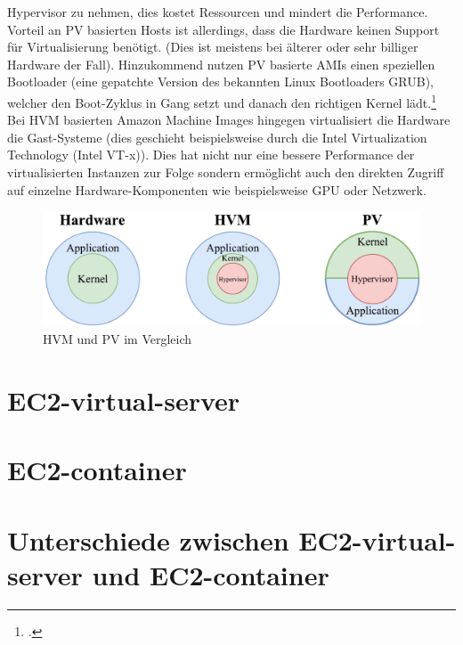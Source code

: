 \documentclass[titlepage]{report}
\begin{document}
Hypervisor zu nehmen, dies kostet Ressourcen und mindert die
Performance. Vorteil an PV basierten Hosts ist allerdings, dass die
Hardware keinen Support für Virtualisierung benötigt. (Dies ist meistens
bei älterer oder sehr billiger Hardware der Fall). Hinzukommend nutzen
PV basierte AMIs einen speziellen Bootloader (eine gepatchte Version des
bekannten Linux Bootloaders GRUB), welcher den Boot\hyp{}Zyklus in
Gang setzt und danach den richtigen Kernel
lädt.\footcite{virtualization} Bei HVM basierten Amazon Machine Images
hingegen virtualisiert die Hardware die Gast\hyp{}Systeme (dies geschieht
beispielsweise durch die Intel Virtualization Technology (Intel VT\hyp{}x)).
Dies hat nicht nur eine bessere Performance der virtualisierten
Instanzen zur Folge sondern ermöglicht auch den direkten Zugriff auf
einzelne Hardware\hyp{}Komponenten wie beispielsweise GPU oder Netzwerk.
\begin{figure}[h]
    \centering
    \includegraphics[width=1.0\textwidth]{figures/hvm_pv.pdf}
    \caption{HVM und PV im Vergleich}\label{fig:5}
\end{figure}
\section{EC2\hyp{}virtual\hyp{}server}
\section{EC2\hyp{}container}
\section{Unterschiede zwischen EC2\hyp{}virtual\hyp{}server und EC2\hyp{}container}
\nocite{*}
\printbibliography
\listoffigures
\end{document}

